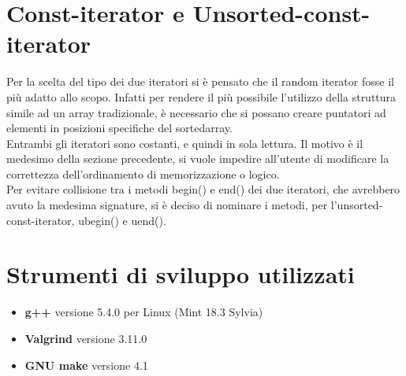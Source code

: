 \documentclass[11pt]{article}
\begin{document}
\section*{Const-iterator e Unsorted-const-iterator}
Per la scelta del tipo dei due iteratori si è pensato che il random iterator fosse il più adatto allo scopo. Infatti per rendere il più possibile l'utilizzo della struttura simile ad un array tradizionale, è necessario che si possano creare puntatori ad elementi in posizioni specifiche del sortedarray.\\
Entrambi gli iteratori sono costanti, e quindi in sola lettura. Il motivo è il medesimo della sezione precedente, si vuole impedire all'utente di modificare la correttezza dell'ordinamento di memorizzazione o logico.\\
Per evitare collisione tra i metodi begin() e end() dei due iteratori, che avrebbero avuto la medesima signature, 
si è deciso di nominare i metodi, per l'unsorted-const-iterator, ubegin() e uend().
\section*{Strumenti di sviluppo utilizzati}
\begin{itemize}
\item \textbf{g++} versione 5.4.0 per Linux (Mint 18.3 Sylvia)
\item \textbf{Valgrind} versione 3.11.0
\item \textbf{GNU make} versione 4.1
\end{itemize} 
\end{document}
